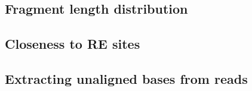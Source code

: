\documentclass[11pt]{article}
\begin{document}
\subsection{Fragment length distribution}

\subsection{Closeness to RE sites}

\subsection{Extracting unaligned bases from reads}



\end{document}
